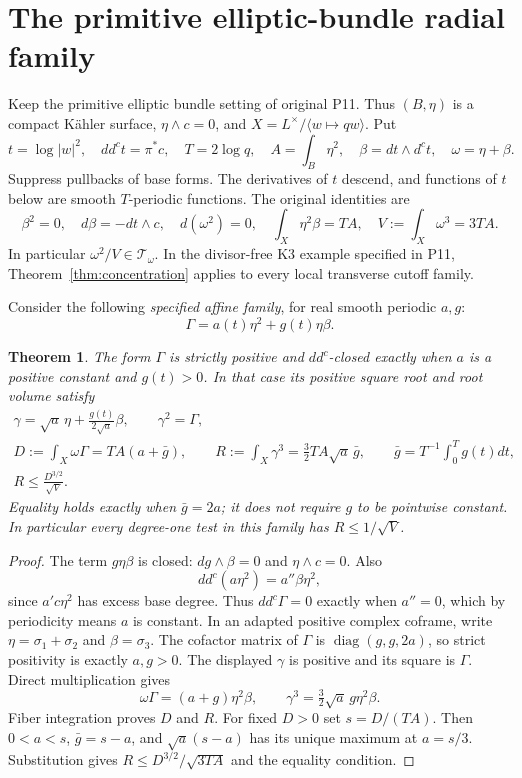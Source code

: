 \documentclass[11pt]{article}
\newtheorem{theorem}{Theorem}
\theoremstyle{remark}\newtheorem{remark}{Remark}
\newcommand{\ddc}{dd^c}
\newcommand{\dc}{d^c}
\begin{document}
\section{The primitive elliptic-bundle radial family}
Keep the primitive elliptic bundle setting of original P11. Thus $(B,\eta)$
is a compact K\"ahler surface, $\eta\wedge c=0$, and
$X=L^\times/\langle w\mapsto qw\rangle$. Put
\[
 t=\log|w|^2,\quad \ddc t=\pi^*c,\quad T=2\log q,\quad
 A=\int_B\eta^2,\quad\beta=dt\wedge\dc t,\quad\omega=\eta+\beta.
\]
Suppress pullbacks of base forms. The derivatives of $t$ descend,
and functions of $t$ below are smooth $T$-periodic functions. The
original identities are
\[
 \beta^2=0,\quad d\beta=-dt\wedge c,\quad
 d(\omega^2)=0,\quad\int_X\eta^2\beta=TA,\quad
 V:=\int_X\omega^3=3TA.
\]
In particular $\omega^2/V\in\mathcal T_\omega$. In the divisor-free
K3 example specified in P11, Theorem~\ref{thm:concentration} applies
to every local transverse cutoff family.

Consider the following \emph{specified affine family}, for real smooth
periodic $a,g$:
\[
 \Gamma=a(t)\eta^2+g(t)\eta\beta.
\]
\begin{theorem}\label{thm:radial}
The form $\Gamma$ is strictly positive and $\ddc$-closed exactly
when $a$ is a positive constant and $g(t)>0$. In that case its positive
square root and root volume satisfy
\begin{gather*}
 \gamma=\sqrt a\,\eta+\frac{g(t)}{2\sqrt a}\beta,
 \qquad\gamma^2=\Gamma,\\
 D:=\int_X\omega\Gamma=TA(a+\bar g),\qquad
 R:=\int_X\gamma^3=\frac32TA\sqrt a\,\bar g,
 \qquad\bar g=T^{-1}\int_0^Tg(t)dt,\\
 R\leq\frac{D^{3/2}}{\sqrt V}.
\end{gather*}
Equality holds exactly when $\bar g=2a$; it does not require $g$ to
be pointwise constant. In particular every degree-one test in this
family has $R\leq1/\sqrt V$.
\end{theorem}
\begin{proof}
The term $g\eta\beta$ is closed: $dg\wedge\beta=0$ and
$\eta\wedge c=0$. Also
\[
 \ddc(a\eta^2)=a''\beta\eta^2,
\]
since $a'c\eta^2$ has excess base degree. Thus $\ddc\Gamma=0$
exactly when $a''=0$, which by periodicity means $a$ is constant.
In an adapted positive complex coframe, write $\eta=\sigma_1+\sigma_2$
and $\beta=\sigma_3$. The cofactor matrix of $\Gamma$ is
$\operatorname{diag}(g,g,2a)$, so strict positivity is exactly $a,g>0$.
The displayed $\gamma$ is positive and its square is $\Gamma$.
Direct multiplication gives
\[
 \omega\Gamma=(a+g)\eta^2\beta,\qquad
 \gamma^3=\tfrac32\sqrt a\,g\eta^2\beta.
\]
Fiber integration proves $D$ and $R$. For fixed $D>0$ set $s=D/(TA)$.
Then $0<a<s$, $\bar g=s-a$, and
$\sqrt a(s-a)$ has its unique maximum at $a=s/3$.
Substitution gives $R\leq D^{3/2}/\sqrt{3TA}$ and the equality condition.
\end{proof}
\end{document}
